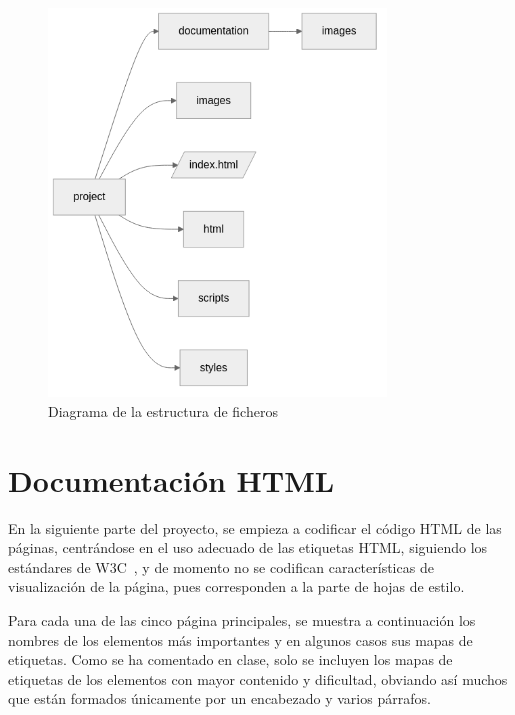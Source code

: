 \documentclass[11pt, a4paper]{book}
\begin{document}
	\begin{figure} [H]
		\centering
		\includegraphics[width=0.8\textwidth]{estructura_ficheros.png}
		\caption{Diagrama de la estructura de ficheros}
	\end{figure}
	
	
	
	
	
	
	
	
	
	
	\chapter{Documentación HTML}
	
	En la siguiente parte del proyecto, se empieza a codificar el código HTML de las páginas, centrándose en el uso adecuado de las etiquetas HTML, siguiendo los estándares de W3C~\cite{w3c}, y de momento no se codifican características de visualización de la página, pues corresponden a la parte de hojas de estilo. 
	
	Para cada una de las cinco página principales, se muestra a continuación los nombres de los elementos más importantes y en algunos casos sus mapas de etiquetas. Como se ha comentado en clase, solo se incluyen los mapas de etiquetas de los elementos con mayor contenido y dificultad, obviando así muchos que están formados únicamente por un encabezado y varios párrafos.
\end{document}
